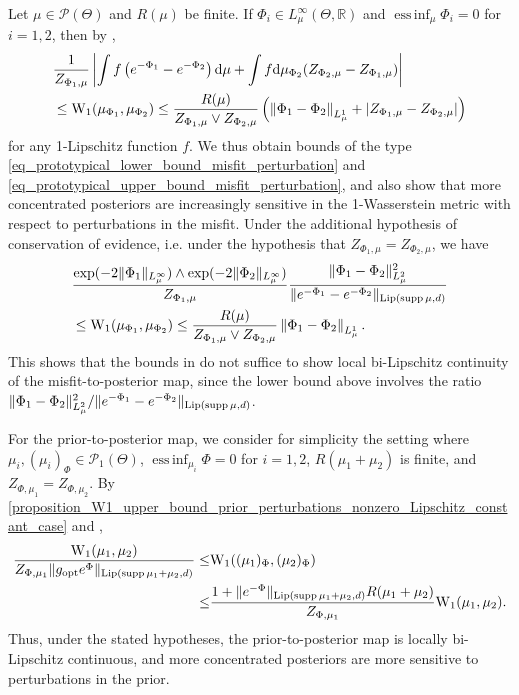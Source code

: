 \documentclass[a4paper]{scrartcl}
\theoremstyle{definition}
\numberwithin{equation}{section}
\newcommand{\R}{\mathbb{R}}
\newcommand{\rd}{\mathrm{d}}
\DeclareMathOperator{\supp}{supp}
\DeclareMathOperator*{\essinf}{ess\,inf}
\newcommand{\Abs}[1]{\left\vert#1\right\vert}
\newcommand{\norm}[1]{\Vert #1 \Vert}
\newcommand{\Norm}[1]{\left\Vert #1 \right\Vert}
\newcommand{\Lip}[0]{\textup{Lip}}
\newcommand{\Was}[0]{\textup{W}}
\newcommand{\opt}[0]{\textup{opt}}
\begin{document}
Let $\mu\in\mathcal{P}(\Theta)$ and $R(\mu)$ be finite. If $\Phi_i\in L^\infty_\mu(\Theta,\R)$ and $\essinf_\mu\Phi_i=0$ for $i=1,2$, then by , 
\begin{align*}
 &\frac{1}{Z_{\Phi_1,\mu}} \Abs{\int f\left(e^{-\Phi_1}-e^{-\Phi_2}\right)\rd\mu+\int f \rd\mu_{\Phi_2}(Z_{\Phi_2,\mu}-Z_{\Phi_1,\mu})} 
 \\
 &\leq \Was_1(\mu_{\Phi_1},\mu_{\Phi_2})\leq \frac{R(\mu)}{Z_{\Phi_1,\mu}\vee Z_{\Phi_2,\mu}}\left(\Norm{\Phi_1-\Phi_2}_{L^1_\mu}+\Abs{Z_{\Phi_1,\mu}-Z_{\Phi_2,\mu}}\right)
\end{align*}
for any 1-Lipschitz function $f$.
We thus obtain bounds of the type \eqref{eq_prototypical_lower_bound_misfit_perturbation} and \eqref{eq_prototypical_upper_bound_misfit_perturbation}, and also show that more concentrated posteriors are increasingly sensitive in the 1-Wasserstein metric with respect to perturbations in the misfit.
Under the additional hypothesis of conservation of evidence, i.e. under the hypothesis that $Z_{\Phi_1,\mu}=Z_{\Phi_2,\mu}$, we have
\begin{align*}
 &\frac{\exp(-2\norm{\Phi_1}_{L^\infty_\mu})\wedge \exp(-2\norm{\Phi_2}_{L^\infty_\mu})}{Z_{\Phi_1,\mu}} \frac{\norm{\Phi_1-\Phi_2}_{L^2_\mu}^{2} }{\norm{e^{-\Phi_1}-e^{-\Phi_2}}_{\Lip(\supp{\mu},d)}} 
 \\
 &\leq \Was_1(\mu_{\Phi_1},\mu_{\Phi_2})\leq \frac{R(\mu)}{Z_{\Phi_1,\mu}\vee Z_{\Phi_2,\mu}}\Norm{\Phi_1-\Phi_2}_{L^1_\mu}.
\end{align*}
This shows that the bounds in  do not suffice to show local bi-Lipschitz continuity of the misfit-to-posterior map, since the lower bound above involves the ratio $\norm{\Phi_1-\Phi_2}_{L^2_\mu}^{2} /\norm{e^{-\Phi_1}-e^{-\Phi_2}}_{\Lip(\supp{\mu},d)}$.

For the prior-to-posterior map, we consider for simplicity the setting where $\mu_i,(\mu_i)_\Phi\in\mathcal{P}_1(\Theta)$, $\essinf_{\mu_i}\Phi=0$ for $i=1,2$, $R(\mu_1+\mu_2)$ is finite, and $Z_{\Phi,\mu_1}=Z_{\Phi,\mu_2}$.
By \ref{proposition_W1_upper_bound_prior_perturbations_nonzero_Lipschitz_constant_case} and ,
\begin{align*}
  \frac{\Was_1(\mu_1,\mu_2)}{ Z_{\Phi,\mu_1}\norm{g_\opt e^\Phi}_{\Lip(\supp{\mu_1+\mu_2},d)}} \leq& \Was_1((\mu_1)_\Phi,(\mu_2)_\Phi)
  \\
  \leq& 
   \frac{1+\norm{e^{-\Phi}}_{\Lip(\supp{\mu_1+\mu_2},d)} R(\mu_1+\mu_2)}{Z_{\Phi,\mu_1}} \Was_1(\mu_1,\mu_2).
\end{align*}
Thus, under the stated hypotheses, the prior-to-posterior map is locally bi-Lipschitz continuous, and more concentrated posteriors are more sensitive to perturbations in the prior. 
\end{document}
